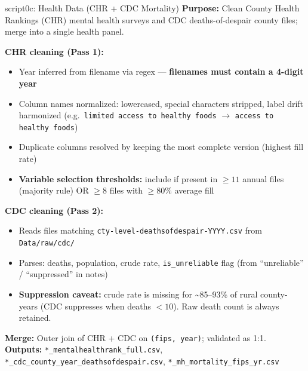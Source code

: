 \documentclass[aspectratio=169]{beamer}
\begin{document}
\begin{frame}{script0c: Health Data (CHR + CDC Mortality)}
\textbf{Purpose:} Clean County Health Rankings (CHR) mental health surveys and CDC deaths-of-despair county files; merge into a single health panel.

\vspace{0.3em}
\textbf{CHR cleaning (Pass 1):}
\begin{itemize}\small
    \item Year inferred from filename via regex — \textbf{filenames must contain a 4-digit year}
    \item Column names normalized: lowercased, special characters stripped, label drift harmonized (e.g.\ \texttt{limited access to healthy foods} $\rightarrow$ \texttt{access to healthy foods})
    \item Duplicate columns resolved by keeping the most complete version (highest fill rate)
    \item \textbf{Variable selection thresholds:} include if present in $\geq 11$ annual files (majority rule) OR $\geq 8$ files with $\geq 80\%$ average fill
\end{itemize}

\textbf{CDC cleaning (Pass 2):}
\begin{itemize}\small
    \item Reads files matching \texttt{cty-level-deathsofdespair-YYYY.csv} from \texttt{Data/raw/cdc/}
    \item Parses: deaths, population, crude rate, \texttt{is\_unreliable} flag (from ``unreliable'' / ``suppressed'' in notes)
    \item \textbf{Suppression caveat:} crude rate is missing for \textasciitilde85--93\% of rural county-years (CDC suppresses when deaths $< 10$). Raw death count is always retained.
\end{itemize}

\textbf{Merge:} Outer join of CHR + CDC on \texttt{(fips, year)}; validated as 1:1. \\
\textbf{Outputs:} \texttt{*\_mentalhealthrank\_full.csv}, \texttt{*\_cdc\_county\_year\_deathsofdespair.csv}, \texttt{*\_mh\_mortality\_fips\_yr.csv}
\end{frame}
\end{document}
